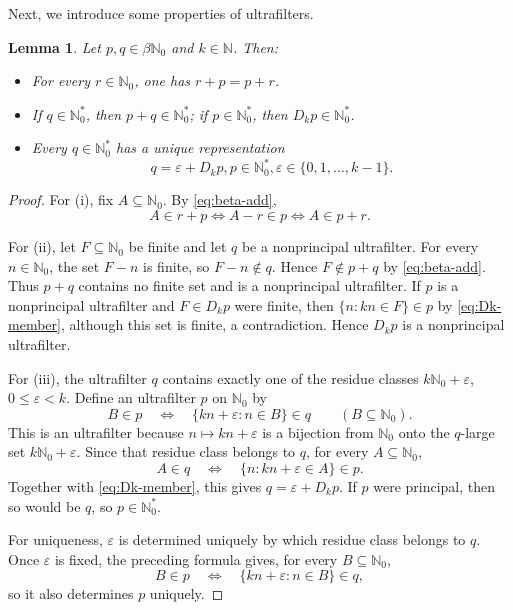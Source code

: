 \documentclass[reqno,12pt]{amsart}
\newtheorem{lemma}[thm]{Lemma}
\newcommand{\Nzero}{\mathbb N_0}
\newcommand{\bN}{\beta\Nzero}
\newcommand{\Nstar}{\Nzero^{*}}
\def \N {\mathbb N}
\numberwithin{equation}{section}
\begin{document}
Next, we introduce some properties of ultrafilters.
\begin{lemma}\label{lem:ultrafilter-facts}
	Let $p,q\in\bN$ and $k\in\N$. Then:
	\begin{itemize}
		\item[(i)] For every $r\in\Nzero$, one has $r+p=p+r$.
		\item[(ii)] If $q\in\Nstar$, then $p+q\in\Nstar$; if
		$p\in\Nstar$, then $D_kp\in\Nstar$.
		\item[(iii)] Every $q\in\Nstar$ has a unique representation
		\begin{equation}\label{eq:parity}
		q=\varepsilon+D_kp,
		p\in\Nstar,
		\varepsilon\in\{0,1,\ldots,k-1\}.
		\end{equation}
	\end{itemize}
\end{lemma}

\begin{proof}
For (i), fix $A\subseteq\Nzero$.  By \eqref{eq:beta-add},
\[
   A\in r+p
   \Longleftrightarrow A-r\in p
   \Longleftrightarrow A\in p+r.
\]

For (ii), let $F\subseteq\Nzero$ be finite and let $q$ be a nonprincipal ultrafilter.  For every
$n\in\Nzero$, the set $F-n$ is finite, so $F-n\notin q$.  Hence
$F\notin p+q$ by \eqref{eq:beta-add}.  Thus $p+q$ contains no finite set and
is a nonprincipal ultrafilter.  If $p$ is a nonprincipal ultrafilter and
$F\in D_kp$ were finite, then
$\{n:kn\in F\}\in p$ by \eqref{eq:Dk-member}, although this set is finite,
a contradiction.  Hence $D_kp$ is a nonprincipal ultrafilter.

For (iii), the ultrafilter $q$ contains exactly one of the residue classes
$k\Nzero+\varepsilon$, $0\leq\varepsilon<k$. Define an
ultrafilter $p$ on $\Nzero$ by
\[
   B\in p
   \quad\Longleftrightarrow\quad
   \{kn+\varepsilon:n\in B\}\in q
   \qquad(B\subseteq\Nzero).
\]
This is an ultrafilter because $n\mapsto kn+\varepsilon$ is a bijection from
$\Nzero$ onto the $q$-large set $k\Nzero+\varepsilon$. Since that residue
class belongs to $q$, for every $A\subseteq\Nzero$,
\[
   A\in q
   \quad\Longleftrightarrow\quad
   \{n:kn+\varepsilon\in A\}\in p.
\]
Together with \eqref{eq:Dk-member}, this gives
$q=\varepsilon+D_kp$. If $p$ were principal, then so would be $q$, so
$p\in\Nstar$.

For uniqueness, $\varepsilon$ is determined uniquely by which residue class
belongs to $q$.  Once $\varepsilon$ is fixed, the preceding formula gives,
for every $B\subseteq\Nzero$,
\[
   B\in p
   \quad\Longleftrightarrow\quad
   \{kn+\varepsilon:n\in B\}\in q,
\]
so it also determines $p$ uniquely.
\end{proof}
\end{document}
